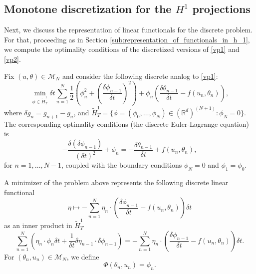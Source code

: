 \documentclass[12pt]{amsart}
\newcommand{\Rr}{{\mathbb{R}}}
\newcommand{\1}{{\chi}}
\newcommand{\lb}{\left(}
\newcommand{\rb}{\right)}
\theoremstyle{definition}
\begin{document}
    
    
    
        
\subsection{Monotone discretization for the $H^1$ projections} 
\label{sub:monotone_discretization_for_the_h_1_projections}
        Next, we discuss the representation of linear functionals for the discrete problem. For that, proceeding as in Section \ref{sub:representation_of_functionals_in_h_1}, 
         we compute the optimality conditions of the discretized versions of \eqref{vp1} and  \eqref{vp2}.
        
        Fix $(u,\theta)\in \mathcal{M}_N$ and consider the following discrete analog to \eqref{vp1}:
    \begin{equation*}
                \min_{\phi\in \tilde H^1_T} \delta t \sum_{n=1}^{N} \frac{1}{2} \lb\phi_n^2 + \lb\frac{\delta \phi_{n-1}}{\delta t}\rb^2\rb 
            + \phi_n \lb \frac{\delta \theta_{n-1}}{\delta t} - f(u_{n},\theta_{n}) \rb,
     \end{equation*}
     where $\delta g_n = g_{n+1}-g_n$, and  $\tilde H^1_T =\{\phi=(\phi_0, \hdots, \phi_N)\in (\Rr^d)^{(N+1)}:\phi_N=0\}$.
     The corresponding optimality conditions (the discrete Euler-Lagrange equation) is 
     \begin{equation}\label{eq:disc_el_phi}
     -\frac{\delta(\delta \phi_{n-1})}{(\delta t)^2} + \phi_n = -\frac{\delta\theta_{n-1}}{\delta t} + f(u_{n},\theta_{n}),
     \end{equation}
     for $n=1,\ldots,N-1$, coupled with the boundary conditions $\phi_N = 0$ and $\phi_{1}=\phi_0$.
         
         A minimizer of the problem above represents the following discrete linear functional
         \begin{equation*}
                \eta \mapsto - \sum_{n=1}^N \eta_n \cdot \lb \frac{\delta \phi_{n-1}}{\delta t} - f(u_n,\theta_n) \rb \delta t
         \end{equation*}
     as an inner product in $\tilde H^1_T$
         \begin{equation*}
                \sum_{n=1}^N \lb \eta_n \cdot \phi_n \delta t + \frac{1}{\delta t}\delta \eta_{n-1}\cdot  \delta \phi_{n-1} \rb  = - \sum_{n=1}^N\eta_n \cdot\lb \frac{\delta \phi_{n-1}}{\delta t} - f(u_n,\theta_n) \rb \delta t.
         \end{equation*}
         For $(\theta_n,u_n) \in \mathcal{M}_N$, we define
          \begin{equation}
          \label{phid}
                \Phi(\theta_n,u_n) = \phi_n.
          \end{equation}
                                       
\end{document}
